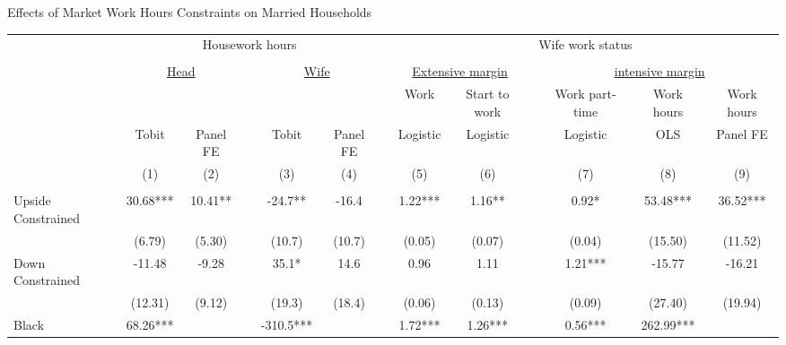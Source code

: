 \clearpage
\begin{landscape}
\begin{center}
\begin{threeparttable}
\caption{Effects of Market Work Hours Constraints on Married Households} \label{Married}
\begin{footnotesize}
\begin{tabular}{lcccccccccccc}
\hline \hline
                     & \multicolumn{5}{c}{Housework hours}  && \multicolumn{6}{c}{Wife work status} \\
\cline{2-6} \cline{8-13} \\
                     & \multicolumn{2}{c}{\underline{Head}} && \multicolumn{2}{c}{\underline{Wife}}  && \multicolumn{2}{c}{\underline{Extensive margin}} && \multicolumn{3}{c}{\underline{intensive margin}} \\
                     &               &               &&               &               && Work          & Start to work && Work part-time& Work hours    & Work hours \\
                     &Tobit          &Panel FE       && Tobit         & Panel FE      && Logistic      & Logistic      && Logistic      & OLS           & Panel FE      \\
                     &(1)            &(2)            &&(3)            &(4)            &&(5)            &(6)            && (7)           & (8)           & (9)   \\
\hline \\[-1ex]
Upside Constrained   &       30.68***&       10.41** &&       -24.7** &       -16.4   &&       1.22***&        1.16** &&        0.92*  &       53.48***&       36.52***\\
                     &      (6.79)   &      (5.30)   &&      (10.7)   &      (10.7)   &&     (0.05)   &      (0.07)   &&      (0.04)   &     (15.50)   &     (11.52)   \\
Down Constrained     &      -11.48   &       -9.28   &&        35.1*  &        14.6   &&       0.96   &        1.11   &&        1.21***&      -15.77   &      -16.21   \\
                     &     (12.31)   &      (9.12)   &&      (19.3)   &      (18.4)   &&     (0.06)   &      (0.13)   &&      (0.09)   &     (27.40)   &     (19.94)   \\
Black                &       68.26***&               &&      -310.5***&               &&       1.72***&        1.26***&&        0.56***&      262.99***&               \\

\end{tabular}
\end{footnotesize}
\end{threeparttable}
\end{center}
\end{landscape}
